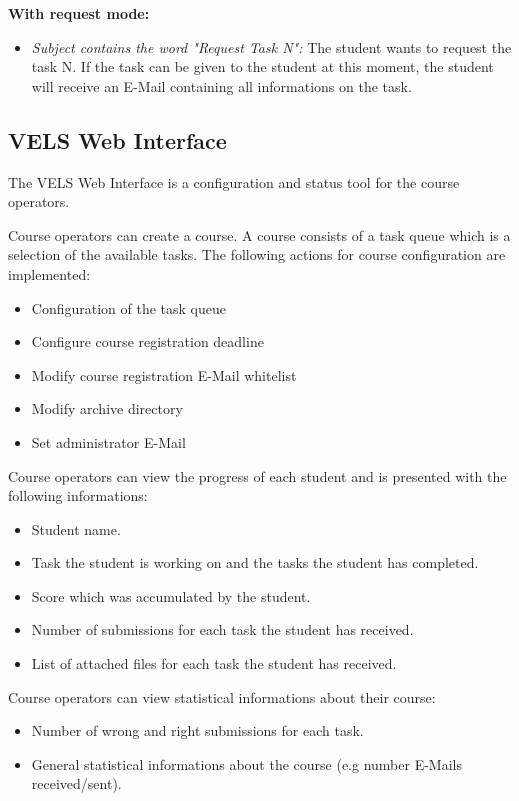 \textbf{With request mode:}
\begin{itemize}
\item \textit{Subject contains the word "Request Task N":} The student wants to request the task N. If the task can be 
	given to the student at this moment, the student will receive an E-Mail containing all informations on the task.
\end{itemize}

\subsection{VELS Web Interface}\label{webinterface}

The VELS Web Interface is a configuration and status tool for the course operators.

Course operators can create a course. A course consists of a task queue which is a selection of the available tasks.
The following actions for course configuration  are implemented:
\begin{itemize}
\item Configuration of the task queue
\item Configure course registration deadline
\item Modify course registration E-Mail whitelist 
\item Modify archive directory
\item Set administrator E-Mail
\end{itemize}

Course operators can view the progress of each student and is presented with the following informations:
\begin{itemize}
\item Student name.
\item Task the student is working on and the tasks the student has completed.
\item Score which was accumulated by the student.
\item Number of submissions for each task the student has received.
\item List of attached files for each task the student has received.
\end{itemize}

Course operators can view statistical informations about their course:
\begin{itemize}
\item Number of wrong and right submissions for each task.
\item General statistical informations about the course (e.g number E-Mails received/sent).
\end{itemize}

